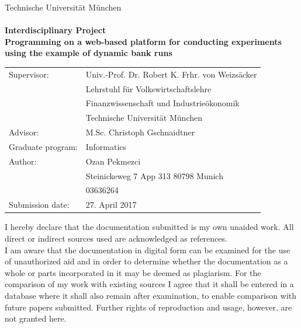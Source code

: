 \begin{titlepage}
\begin{center}
{\Huge Technische Universit\"at M\"unchen} 
\\
\vspace*{1cm}
{\huge {}} 
\\ 
\vspace*{2cm}
{\Huge {\bf Interdisciplinary Project}}\\
\vspace*{1cm}
{\Large {\bf Programming on a web-based platform for conducting experiments using the example of dynamic bank runs }}\\
\vspace*{4cm}
{ 
\begin{tabular}{ll}
Supervisor: & Univ.-Prof. Dr. Robert K. Frhr. von Weizs\"{a}cker \\
			& Lehrstuhl f\"{u}r Volkswirtschaftslehre\\
			& Finanzwissenschaft und Industrie\"{o}konomik\\
			& Technische Universit\"{a}t M\"{u}nchen \vspace*{0.3cm} \\ 
Advisor: & M.Sc. Christoph Gschnaidtner 		\vspace*{0.3cm}  \\
Graduate program: & Informatics		\vspace*{0.3cm} \\ 
Author: & Ozan Pekmezci \\
		& Steinickeweg 7 App 313 80798 Munich \\
		& 03636264 \vspace*{0.3cm} \\
Submission date: & 27. April 2017
\end{tabular}
}

\end{center}
\end{titlepage}




\thispagestyle{plain}
\vspace*{11cm}
\noindent
I hereby declare that the documentation submitted is my own unaided work. All direct or indirect sources used are acknowledged as references. \\

I am aware that the documentation in digital form can be examined for the use of unauthorized aid and in order to determine whether the documentation as a whole or parts incorporated in it may be deemed as plagiarism. For the comparison of my work with existing sources I agree that it shall be entered in a database where it shall also remain after examination, to enable comparison with future papers submitted. Further rights of reproduction and usage, however, are not granted here.\\
 
